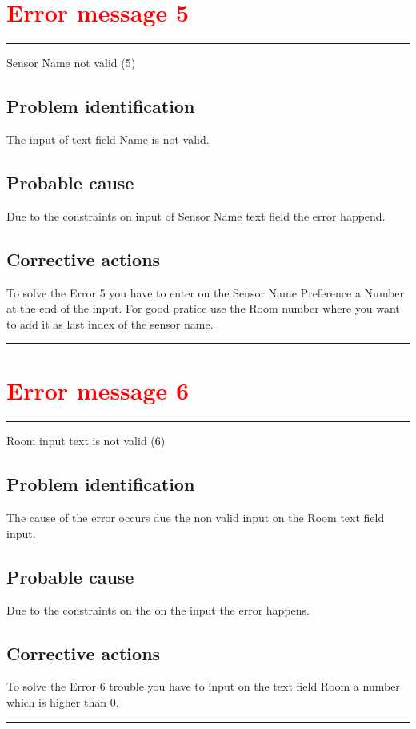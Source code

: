 \section{\textbf{\textcolor{red}{Error message 5}}}
\hrule
\vspace{0.5cm}
Sensor Name not valid (5)
\subsection{Problem identification}
The input of text field Name is not valid.

\subsection{Probable cause}
Due to the constraints on  input of Sensor Name text field the error happend.

\subsection{Corrective actions}
To solve the Error 5 you have to enter on the Sensor Name Preference a Number at
the end of the input. For good pratice use the Room number where you want to add
it as last index of the sensor name.
\vspace{0.5cm}
\hrule
\break

\section{\textbf{\textcolor{red}{Error message 6}}}
\hrule
\vspace{0.5cm}
Room input text is not valid (6)
\subsection{Problem identification}
The cause of the error occurs due the non valid input on the Room text field
input.

\subsection{Probable cause}
Due to the constraints on the on the input the error happens.

\subsection{Corrective actions}
To solve the Error 6 trouble you have to input on the text field Room a number
which is higher than 0.
\vspace{0.5cm}
\hrule
\hfill
